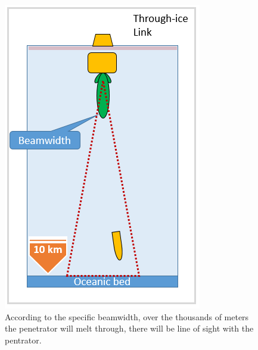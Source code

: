 \begin{figure}[htb]
	\centering
	\includegraphics[width=.66\textwidth]{figures/comms/beamW-coverageFromSurf}
	\caption{According to the specific beamwidth, over the thousands of meters the penetrator will melt through, there will be line of sight with the pentrator.}
	\label{fig:beamCover}
\end{figure}